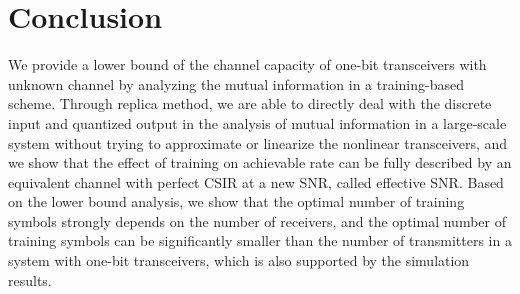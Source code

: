 \documentclass[conference]{IEEEtran}
\begin{document}
\section{Conclusion}
We provide a lower bound of the channel capacity of one-bit transceivers with unknown channel by analyzing the mutual information in a training-based scheme. Through replica method, we are able to directly deal with the discrete input and quantized output in the analysis of mutual information in a large-scale system without trying to approximate or linearize the nonlinear transceivers, and we show that the effect of training on achievable rate can be fully described by an equivalent channel with perfect CSIR at a new SNR, called effective SNR. Based on the lower bound analysis, we show that the optimal number of training symbols strongly depends on the number of receivers, and the optimal number of training symbols can be significantly smaller than the number of transmitters in a system with one-bit transceivers, which is also supported by the simulation results.




\end{document}
